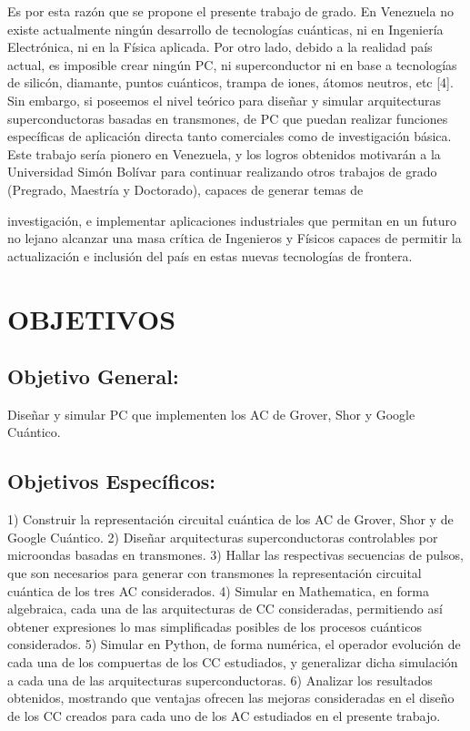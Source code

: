 Es por esta razón que se propone el presente trabajo de grado. En Venezuela no existe actualmente ningún desarrollo de tecnologías cuánticas, ni en Ingeniería Electrónica, ni en la Física aplicada. Por otro lado, debido a la realidad país actual, es imposible crear ningún PC, ni superconductor ni en base a tecnologías de silicón, diamante, puntos cuánticos, trampa de iones, átomos neutros, etc [4]. Sin embargo, si poseemos el nivel teórico para diseñar y simular arquitecturas superconductoras basadas en transmones, de PC que puedan realizar funciones específicas de aplicación directa tanto comerciales como de investigación básica.  Este trabajo sería pionero en Venezuela, y los logros obtenidos motivarán a la Universidad Simón Bolívar para continuar realizando otros trabajos de grado (Pregrado, Maestría y Doctorado), capaces de generar temas de

investigación, e implementar aplicaciones industriales que permitan en un futuro no lejano alcanzar una masa crítica de Ingenieros y Físicos capaces de permitir la actualización e inclusión del país en estas nuevas tecnologías de frontera.

\section{OBJETIVOS}

\subsection{Objetivo General:}

Diseñar y simular PC que implementen los AC de Grover, Shor y Google Cuántico.

\subsection{Objetivos Específicos:}

1) Construir la representación circuital cuántica de los AC de Grover, Shor y de Google Cuántico.
2) Diseñar arquitecturas superconductoras controlables por microondas basadas en transmones.
3) Hallar las respectivas secuencias de pulsos, que son necesarios para generar con transmones la
representación circuital cuántica de los tres AC considerados.
4) Simular en Mathematica, en forma algebraica, cada una de las arquitecturas de CC consideradas,
permitiendo así obtener expresiones lo mas simplificadas posibles de los procesos cuánticos considerados.
5) Simular en Python, de forma numérica, el operador evolución de cada una de los compuertas de los CC
estudiados, y generalizar dicha simulación a cada una de las arquitecturas superconductoras.
6) Analizar los resultados obtenidos, mostrando que ventajas ofrecen las mejoras consideradas en el
diseño de los CC creados para cada uno de los AC estudiados en el presente trabajo.

